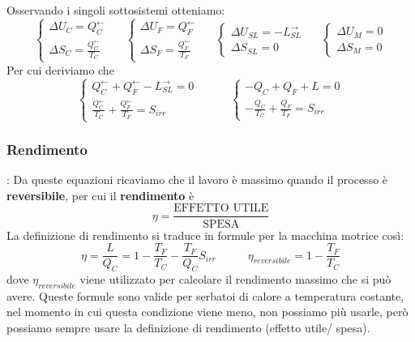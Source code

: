 Osservando i singoli sottosistemi otteniamo:
\[
    \begin{cases}
        \Delta U_C = Q_C^\leftarrow \\ \Delta S_C = \frac{Q_C^\leftarrow }{T_C}
    \end{cases} \;\;\;\;\; \begin{cases}
        \Delta U_F = Q_F^\leftarrow \\ \Delta S_F = \frac{Q_F^\leftarrow}{T_F}
    \end{cases} \;\;\;\;\; \begin{cases}
        \Delta U_{SL} = - L_{SL}^\rightarrow \\ \Delta S_{SL} = 0
    \end{cases} \;\;\;\;\; \begin{cases}
        \Delta U_M = 0\\ \Delta S_M = 0
    \end{cases}
\]
Per cui deriviamo che
\[
    \begin{cases}
        Q_C^\leftarrow  + Q_F^\leftarrow  - L_{SL}^\rightarrow  = 0\\
        \frac{Q_C^\leftarrow}{T_C} + \frac{Q_F^\leftarrow}{T_F} = S_{irr}
    \end{cases} \;\;\;\;\;\;\;\;\;\; \begin{cases}
        -Q_C + Q_F + L = 0\\
        -\frac{Q_C}{T_C} + \frac{Q_F}{T_F} = S_{irr}
    \end{cases}
\]
\subsubsection{Rendimento}:\newline
Da queste equazioni ricaviamo che il lavoro è massimo quando il processo è \textbf{reversibile}, per cui il \textbf{rendimento} è
\[
    \eta = \frac{\text{EFFETTO UTILE}}{\text{SPESA}}
\]
La definizione di rendimento si traduce in formule per la macchina motrice così:
\[
    \eta = \frac{L}{Q_C} = 1- \frac{T_F}{T_C} - \frac{T_F}{Q_C} S_{irr} \;\;\;\;\;\;\;\;\;\;\eta_{reversibile} = 1 - \frac{T_F}{T_C}
\]
dove $\eta_{reversibile}$ viene utilizzato per calcolare il rendimento massimo che si può avere.\newline
Queste formule sono valide per serbatoi di calore a temperatura costante, nel momento in cui questa condizione viene meno, non possiamo più usarle, però possiamo sempre usare la definizione di rendimento (effetto utile/ spesa).
